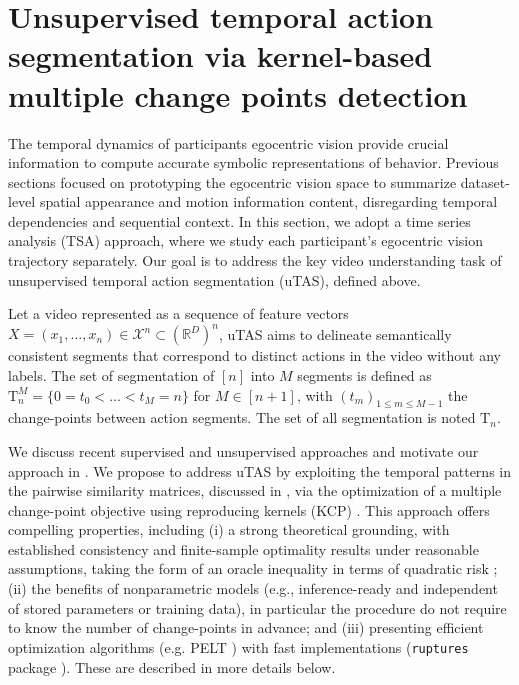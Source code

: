         

\section{Unsupervised temporal action segmentation via kernel-based multiple change points detection}
    \label{sec:chapter_5_unsupervised_temporal_segmentation}

    The temporal dynamics of participants egocentric vision provide crucial information to compute accurate symbolic representations of behavior. Previous sections focused on prototyping the egocentric vision space to summarize dataset-level spatial appearance and motion information content, disregarding temporal dependencies and sequential context. In this section, we adopt a time series analysis (TSA) approach, where we study each participant's egocentric vision trajectory separately. Our goal is to address the key video understanding task of unsupervised temporal action segmentation (uTAS), defined above.
    
    Let a video represented as a sequence of feature vectors $X = (x_1, \ldots, x_n) \in \mathcal{X}^n \subset (\mathbb{R}^D)^n$, uTAS aims to delineate semantically consistent segments that correspond to distinct actions in the video without any labels. The set of segmentation of $[n]$ into $M$ segments is defined as $\mathrm{T}_n^M = \{0 = t_0 < ... < t_M = n\}$ for $M \in [n+1]$, with $(t_m)_{1 \leq m \leq M-1}$ the change-points between action segments. The set of all segmentation is noted $\mathrm{T}_n$.

    We discuss recent supervised and unsupervised approaches and motivate our approach in . We propose to address uTAS by exploiting the temporal patterns in the pairwise similarity matrices, discussed in , via the optimization of a multiple change-point objective using reproducing kernels (KCP) \cite{cpt}. This approach offers compelling properties, including (i) a strong theoretical grounding, with established consistency \cite{garreau2018consistent} and finite-sample optimality results under reasonable assumptions, taking the form of an oracle inequality in terms of quadratic risk \cite{CELISSE2018200, cpt}; (ii) the benefits of nonparametric models (e.g., inference-ready and independent of stored parameters or training data), in particular the procedure do not require to know the number of change-points in advance; and (iii) presenting efficient optimization algorithms (e.g. PELT \cite{pelt}) with fast implementations (\texttt{ruptures} package \cite{ruptures}). These are described in more details below.


